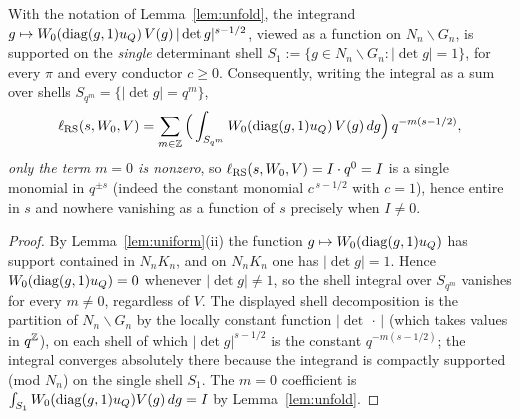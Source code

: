 \begin{qtwoproposition}\label{prop:singleshell}
With the notation of Lemma~\ref{lem:unfold}, the integrand
$g\mapsto W_0(\operatorname{diag}(g,1)u_Q)\,V(g)\,|\det g|^{s-1/2}$, viewed as a function on
$N_n\backslash G_n$, is supported on the \emph{single} determinant shell
$S_1:=\{g\in N_n\backslash G_n:|\det g|=1\}$, for every $\pi$ and every conductor $c\ge0$.
Consequently, writing the integral as a sum over shells $S_{q^{m}}=\{|\det g|=q^{m}\}$,
\[
\ell_{\mathrm{RS}}(s,W_0,V)=\sum_{m\in\mathbb{Z}}\Big(\int_{S_{q^m}}W_0(\operatorname{diag}(g,1)u_Q)\,V(g)\,dg\Big)\,q^{-m(s-1/2)},
\]
\emph{only the term $m=0$ is nonzero}, so $\ell_{\mathrm{RS}}(s,W_0,V)=I\cdot q^{0}=I$ is a single monomial
in $q^{\pm s}$ \textup{(}indeed the constant monomial $c^{\,s-1/2}$ with $c=1$\textup{)}, hence
entire in $s$ and nowhere vanishing as a function of $s$ precisely when $I\ne0$.
\end{qtwoproposition}

\begin{proof}
By Lemma~\ref{lem:uniform}(ii) the function $g\mapsto W_0(\operatorname{diag}(g,1)u_Q)$ has support contained
in $N_nK_n$, and on $N_nK_n$ one has $|\det g|=1$. Hence $W_0(\operatorname{diag}(g,1)u_Q)=0$ whenever
$|\det g|\ne1$, so the shell integral over $S_{q^m}$ vanishes for every $m\ne0$, regardless of
$V$. The displayed shell decomposition is the partition of $N_n\backslash G_n$ by the
locally constant function $|\det\,\cdot\,|$ \textup{(}which takes values in $q^{\mathbb{Z}}$\textup{)},
on each shell of which $|\det g|^{s-1/2}$ is the constant $q^{-m(s-1/2)}$; the integral converges
absolutely there because the integrand is compactly supported \textup{(}mod $N_n$\textup{)} on the
single shell $S_1$. The $m=0$ coefficient is $\int_{S_1}W_0(\operatorname{diag}(g,1)u_Q)V(g)\,dg=I$ by
Lemma~\ref{lem:unfold}.
\end{proof}

